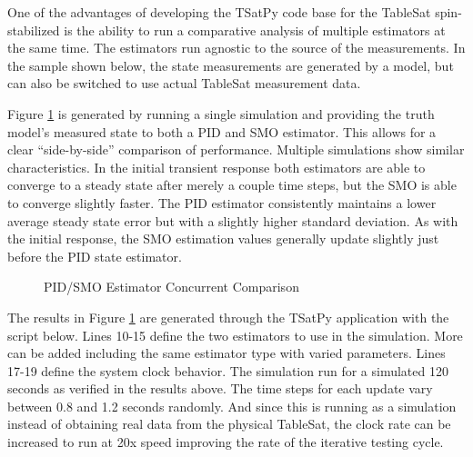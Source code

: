 One of the advantages of developing the TSatPy code base for the TableSat spin-stabilized is the ability to run a comparative analysis of multiple estimators at the same time.  The estimators run agnostic to the source of the measurements.  In the sample shown below, the state measurements are generated by a model, but can also be switched to use actual TableSat measurement data.

Figure \ref{fig:PIDSMOEstimatorConcurrentComparison} is generated by running a single simulation and providing the truth model's measured state to both a PID and SMO estimator.  This allows for a clear ``side-by-side'' comparison of performance.  Multiple simulations show similar characteristics.  In the initial transient response both estimators are able to converge to a steady state after merely a couple time steps, but the SMO is able to converge slightly faster.  The PID estimator consistently maintains a lower average steady state error but with a slightly higher standard deviation.  As with the initial response, the SMO estimation values generally update slightly just before the PID state estimator.

\begin{figure}[H]
  \centerline{}
  \caption{PID/SMO Estimator Concurrent Comparison}
  \label{fig:PIDSMOEstimatorConcurrentComparison}
\end{figure}

The results in Figure \ref{fig:PIDSMOEstimatorConcurrentComparison} are generated through the TSatPy application with the script below.  Lines 10-15 define the two estimators to use in the simulation.  More can be added including the same estimator type with varied parameters.  Lines 17-19 define the system clock behavior.  The simulation run for a simulated 120 seconds as verified in the results above.  The time steps for each update vary between 0.8 and 1.2 seconds randomly.  And since this is running as a simulation instead of obtaining real data from the physical TableSat, the clock rate can be increased to run at 20x speed improving the rate of the iterative testing cycle.

